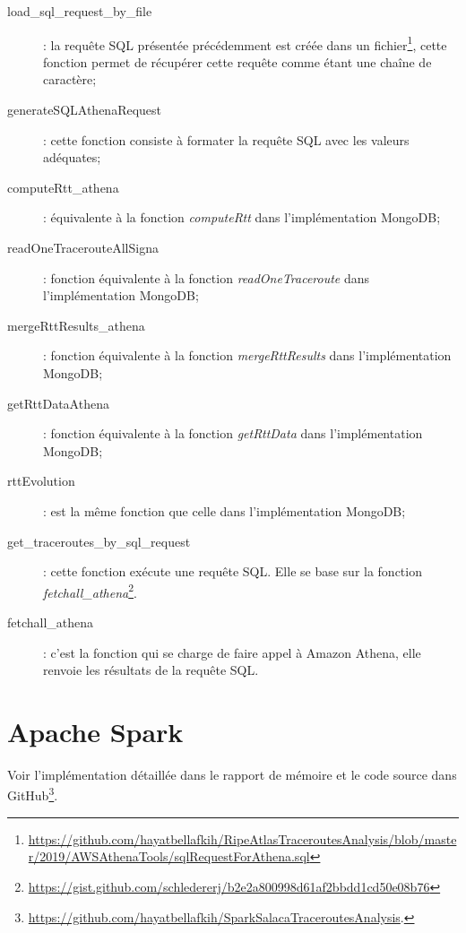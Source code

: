 \documentclass[]{report}
\begin{document}
\begin{description}
	\item[load\_sql\_request\_by\_file] : la requête SQL présentée précédemment est créée dans un fichier\footnote{\url{https://github.com/hayatbellafkih/RipeAtlasTraceroutesAnalysis/blob/master/2019/AWSAthenaTools/sqlRequestForAthena.sql}},  cette fonction permet de récupérer cette requête comme étant une chaîne de caractère;
	
	\item[generateSQLAthenaRequest] : cette fonction consiste à formater la requête SQL avec les  valeurs adéquates;
	
	\item[computeRtt\_athena] : équivalente à  la fonction  \textit{computeRtt}  dans l'implémentation MongoDB;
	
	\item[readOneTracerouteAllSigna] : fonction équivalente à  la fonction \textit{readOneTraceroute} dans l'implémentation MongoDB;
	
	\item[mergeRttResults\_athena] : fonction équivalente à la fonction \textit{mergeRttResults}  dans l'implémentation MongoDB;
	
	\item[getRttDataAthena] :  fonction équivalente à la fonction \textit{getRttData}  dans l'implémentation MongoDB;
	
	\item[rttEvolution] : est la même fonction que celle dans l'implémentation MongoDB;
	
	\item[get\_traceroutes\_by\_sql\_request] : cette fonction  exécute une requête SQL. Elle se base sur la fonction  \textit{fetchall\_athena}\footnote{\url{https://gist.github.com/schledererj/b2e2a800998d61af2bbdd1cd50e08b76}}.
	\item[fetchall\_athena] : c'est la fonction qui se charge de faire appel à Amazon Athena, elle renvoie les résultats de la requête SQL. 

\end{description}


\chapter*{Apache Spark}
Voir l'implémentation détaillée dans le rapport  de mémoire et le code source dans GitHub\footnote{\url{https://github.com/hayatbellafkih/SparkSalacaTraceroutesAnalysis}.}.
\end{document}
